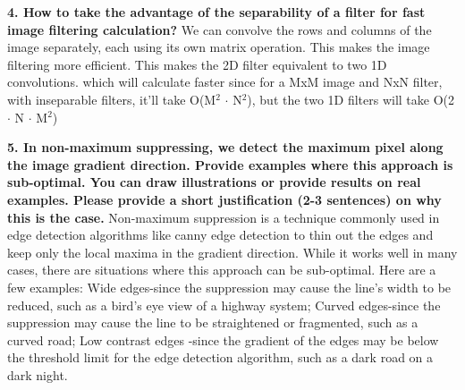 \documentclass[11pt]{article}
\begin{document}
    \textbf{4. How to take the advantage of the separability of a filter for fast image filtering calculation?}\newline
    We can convolve the rows and columns of the image separately, each using its own matrix operation. This makes the image filtering more
    efficient. This makes the 2D filter equivalent to two 1D convolutions. which will calculate faster since for a MxM image and NxN filter, with
    inseparable filters, it'll take O(M$^2$ $\cdot$ N$^2$), but the two 1D filters will take O(2 $\cdot$ N $\cdot$ M$^2$)\newline

    \textbf{5. In non-maximum suppressing, we detect the maximum pixel along the image gradient direction. Provide examples where this approach is sub-optimal.
    You can draw illustrations or provide results on real examples. Please provide a short justification (2-3 sentences) on why this is the case.}\newline
    Non-maximum suppression is a technique commonly used in edge detection algorithms like canny edge detection to thin out the edges and keep only
    the local maxima in the gradient direction. While it works well in many cases, there are situations where this approach can be sub-optimal.
    Here are a few examples: Wide edges-since the suppression may cause the line's width to be reduced, such as a bird's eye view of a highway
    system; Curved edges-since the suppression may cause the line to be straightened or fragmented, such as a curved road; Low contrast edges
    -since the gradient of the edges may be below the threshold limit for the edge detection algorithm, such as a dark road on a dark night.\newline
    
\end{document}
